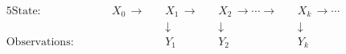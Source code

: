 \begin{alignat*}{5}
    \text{State:}& \quad && X_0 \, \rightarrow \, && X_1 \, \rightarrow \, && X_2 \,\rightarrow \cdots \rightarrow \, && X_k \, \rightarrow \cdots \\
                 & &&  && \downarrow && \downarrow && \downarrow \\
    \text{Observations:}& \quad && && Y_1 && Y_2 && Y_k
\end{alignat*}
